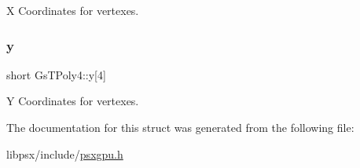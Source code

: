 X Coordinates for vertexes. 

\mbox{\label{structGsTPoly4_a0a64e0d7ce40b4a5690b5af814c4fd7d}} 
\subsubsection{\texorpdfstring{y}{y}}
{\footnotesize\ttfamily short Gs\+T\+Poly4\+::y\mbox{[}4\mbox{]}}



Y Coordinates for vertexes. 



The documentation for this struct was generated from the following file\+:\begin{DoxyCompactItemize}
\item 
libpsx/include/\hyperlink{psxgpu_8h}{psxgpu.\+h}\end{DoxyCompactItemize}
